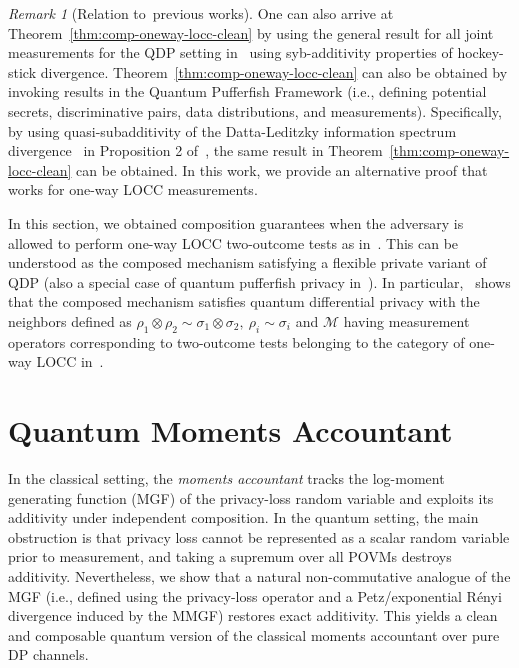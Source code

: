\documentclass[11pt]{article}
\theoremstyle{plain}
\theoremstyle{remark}
\newtheorem{remark}[theo]{Remark}
\begin{document}
{
\begin{remark}[Relation to~previous works]
One can also arrive at Theorem~\ref{thm:comp-oneway-locc-clean} by using the general result for all joint measurements for the QDP setting in~\citep[Corollary~III.3]{hirche2022quantum} using syb-additivity properties of hockey-stick divergence.
Theorem~\ref{thm:comp-oneway-locc-clean} can also be obtained by
invoking results in the Quantum Pufferfish Framework (i.e., defining potential secrets, discriminative pairs, data distributions, and measurements). 
Specifically, by using
quasi-subadditivity of the Datta-Leditzky information spectrum divergence~\citep{DattaL15}
in Proposition 2 of~\cite{NuradhaGW24}, the same result in
Theorem~\ref{thm:comp-oneway-locc-clean} can be obtained. In this work, we provide an alternative proof that works for one-way LOCC measurements.
\end{remark}
}

In this section, we obtained composition guarantees when the adversary is allowed to perform one-way LOCC two-outcome tests as in~. This can be understood as the composed mechanism satisfying a flexible private variant of QDP (also a special case of quantum pufferfish privacy in~\cite{NuradhaGW24}).
In particular,~ shows that the composed mechanism satisfies quantum differential privacy with the neighbors defined as $\rho_1\otimes\rho_2 \sim \sigma_1\otimes\sigma_2, \ \rho_i\sim\sigma_i$ and $\mathcal{M}$ having measurement operators corresponding to two-outcome tests belonging to the category of one-way LOCC in~.

\section{Quantum Moments Accountant}
\label{sec:qma}

In the classical setting, the \emph{moments accountant} tracks the log-moment
generating function (MGF) of the privacy-loss random variable and exploits its
additivity under independent composition.  In the quantum setting, the main
obstruction is that privacy loss cannot be represented as a scalar random
variable prior to measurement, and taking a supremum over all POVMs destroys
additivity. Nevertheless, we show that a natural non-commutative analogue of the MGF (i.e., defined using the
privacy-loss operator and a Petz/exponential R\'enyi divergence induced by the MMGF) restores exact additivity.
This yields a clean and composable
quantum version of the classical moments accountant over pure DP channels.
\end{document}
